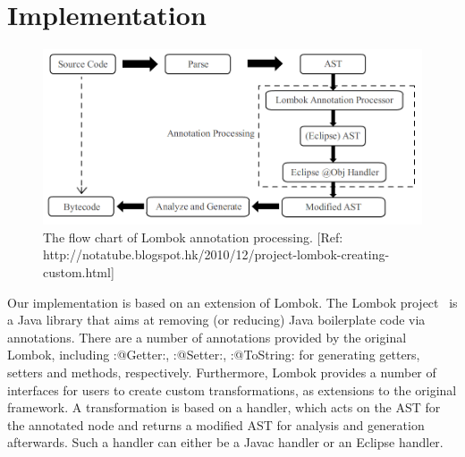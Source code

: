 \section{Implementation}

\begin{figure}[t]\label{fig:lombok}
\centering
\includegraphics[width=5in]{pdfs/lombok.png}
\caption{The flow chart of Lombok annotation processing. [Ref: http://notatube.blogspot.hk/2010/12/project-lombok-creating-custom.html]
}
\end{figure}


Our implementation is based on an extension of Lombok. The Lombok
project~\cite{lombok} is a Java library that aims at removing (or
reducing) Java boilerplate code via
annotations. There are a number of annotations provided by the
original Lombok, including \Q:@Getter:, \Q:@Setter:,
\Q:@ToString: for generating getters, setters and 
methods, respectively.  Furthermore, Lombok provides a number of
interfaces for users to create custom transformations, as extensions
to the original framework.
A transformation is based on a handler, which acts on the AST for the
annotated node and returns a modified AST for analysis and
generation afterwards. Such a handler can either be a Javac handler or
an Eclipse handler.

